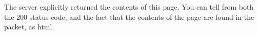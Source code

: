 The server explicitly returned the contents of this page. You can tell from both the 200 status code, and the fact that the contents of the page are found in the packet, as html.